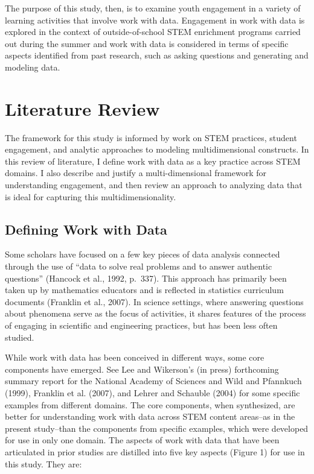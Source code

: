 \documentclass[]{book}
\theoremstyle{definition}
\theoremstyle{definition}
\theoremstyle{definition}
\theoremstyle{remark}
\begin{document}
The purpose of this study, then, is to examine youth engagement in a
variety of learning activities that involve work with data. Engagement
in work with data is explored in the context of outside-of-school STEM
enrichment programs carried out during the summer and work with data is
considered in terms of specific aspects identified from past research,
such as asking questions and generating and modeling data.

\chapter{Literature Review}\label{literature-review}

The framework for this study is informed by work on STEM practices,
student engagement, and analytic approaches to modeling multidimensional
constructs. In this review of literature, I define work with data as a
key practice across STEM domains. I also describe and justify a
multi-dimensional framework for understanding engagement, and then
review an approach to analyzing data that is ideal for capturing this
multidimensionality.

\section{Defining Work with Data}\label{defining-work-with-data}

Some scholars have focused on a few key pieces of data analysis
connected through the use of ``data to solve real problems and to answer
authentic questions'' (Hancock et al., 1992, p.~337). This approach has
primarily been taken up by mathematics educators and is reflected in
statistics curriculum documents (Franklin et al., 2007). In science
settings, where answering questions about phenomena serve as the focus
of activities, it shares features of the process of engaging in
scientific and engineering practices, but has been less often studied.

While work with data has been conceived in different ways, some core
components have emerged. See Lee and Wikerson's (in press) forthcoming
summary report for the National Academy of Sciences and Wild and
Pfannkuch (1999), Franklin et al. (2007), and Lehrer and Schauble (2004)
for some specific examples from different domains. The core components,
when synthesized, are better for understanding work with data across
STEM content areas--as in the present study--than the components from
specific examples, which were developed for use in only one domain. The
aspects of work with data that have been articulated in prior studies
are distilled into five key aspects (Figure 1) for use in this study.
They are:
\end{document}
